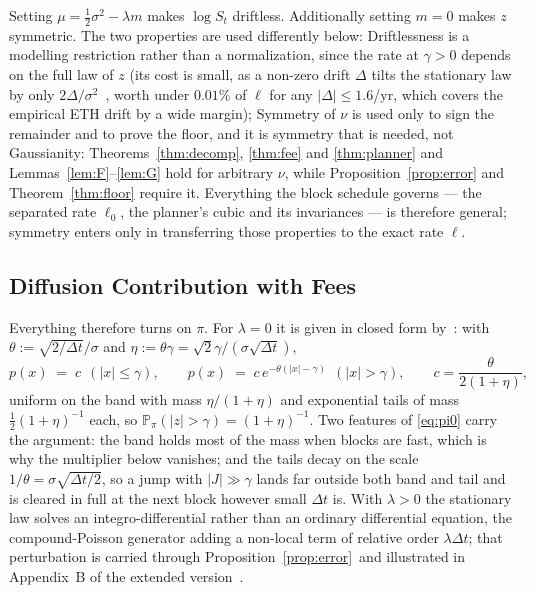 \documentclass[runningheads]{llncs}
\newcommand{\Prob}{\mathbb{P}}
\newcommand{\dt}{\Delta t}
\newcommand{\1}{\mathbf{1}}
\newif\ifextended
\begin{document}
\begin{remark}\label{rem:symmetry}
Setting $\mu = \tfrac{1}{2}\sigma^2 - \lambda m$ makes $\log S_t$ driftless. Additionally setting $m=0$ makes $z$ symmetric. The two properties are used differently below: Driftlessness is a modelling restriction rather than a normalization, since the rate at $\gamma>0$ depends on the full law of $z$ (its cost is small, as a non-zero drift $\Delta$ tilts the stationary law by only $2\Delta/\sigma^2$~\cite[Thm.~8]{milionis2023automated}, worth under $0.01\%$ of $\ell$ for any $|\Delta|\le1.6$/yr, which covers the empirical ETH drift by a wide margin); Symmetry of $\nu$ is used only to sign the remainder and to prove the floor, and it is symmetry that is needed, not Gaussianity: Theorems~\ref{thm:decomp}, \ref{thm:fee} and \ref{thm:planner} and Lemmas~\ref{lem:F}--\ref{lem:G} hold for arbitrary $\nu$, while Proposition~\ref{prop:error} and Theorem~\ref{thm:floor} require it. Everything the block schedule governs --- the separated rate $\ell_0$, the planner's cubic and its invariances --- is therefore general; symmetry enters only in transferring those properties to the exact rate $\ell$.
\end{remark}

\subsection{Diffusion Contribution with Fees}

Everything therefore turns on $\pi$. For $\lambda=0$ it is given in closed form by~\cite[Thm.~1]{milionis2023automated}: with $\theta := \sqrt{2/\dt}/\sigma$ and $\eta := \theta\gamma = \sqrt{2}\gamma/(\sigma\sqrt{\dt})$,
\begin{equation}\label{eq:pi0}
p(x) \;=\; c \ \ (|x|\le\gamma), \qquad p(x) \;=\; c\,e^{-\theta(|x|-\gamma)} \ \ (|x|>\gamma), \qquad c=\frac{\theta}{2(1+\eta)},
\end{equation}
uniform on the band with mass $\eta/(1+\eta)$ and exponential tails of mass $\tfrac12(1+\eta)^{-1}$ each, so $\Prob_\pi(|z|>\gamma) = (1+\eta)^{-1}$. Two features of \eqref{eq:pi0} carry the argument: the band holds most of the mass when blocks are fast, which is why the multiplier below vanishes; and the tails decay on the scale $1/\theta = \sigma\sqrt{\dt/2}$, so a jump with $|J|\gg\gamma$ lands far outside both band and tail and is cleared in full at the next block however small $\dt$ is. With $\lambda>0$ the stationary law solves an integro-differential rather than an ordinary differential equation, the compound-Poisson generator adding a non-local term of relative order $\lambda\dt$; that perturbation is carried through Proposition~\ref{prop:error}\ifextended\ and illustrated in Figure~\ref{fig:statlaw}\else\ and illustrated in Appendix~B of the extended version~\cite{bundi2026ext}\fi.
\end{document}
